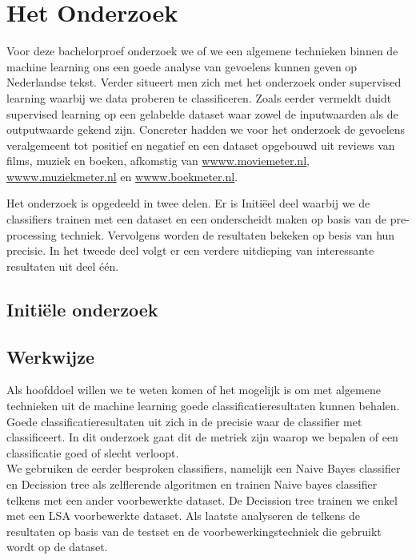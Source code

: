 \chapter{Het Onderzoek}\label{Het Onderzoek}

Voor deze bachelorproef onderzoek we of we een algemene technieken binnen de machine learning ons een goede analyse van gevoelens kunnen geven op Nederlandse tekst. Verder situeert men zich met het onderzoek  onder supervised learning waarbij we data proberen te classificeren. Zoals eerder vermeldt duidt supervised learning op een gelabelde dataset waar zowel de inputwaarden als de outputwaarde gekend zijn. Concreter hadden we voor het onderzoek de gevoelens veralgemeent tot positief en negatief en een dataset opgebouwd uit reviews van films, muziek en boeken, afkomstig van \url{wwww.moviemeter.nl}, \url{wwww.muziekmeter.nl}
en \url{wwww.boekmeter.nl}.

Het onderzoek is opgedeeld in twee delen. Er is Initi\"eel deel waarbij we de classifiers trainen met een dataset en een onderscheidt maken op basis van de pre-processing techniek. Vervolgens worden de resultaten bekeken op besis van hun precisie. In het tweede deel volgt er een verdere uitdieping van interessante resultaten uit deel \'e\'en.

\section{Initi\"ele onderzoek}\label{Deel 1}

\section{Werkwijze}\label{Werkwijze}

Als hoofddoel willen we te weten komen of het mogelijk is om met algemene technieken uit de machine learning goede classificatieresultaten kunnen behalen. Goede classificatieresultaten uit zich in de precisie waar de classifier met classificeert. In dit onderzoek gaat dit de metriek zijn waarop we bepalen of een classificatie goed of slecht verloopt.\\
We gebruiken de eerder besproken classifiers, namelijk een Naive Bayes classifier en Decission tree als zelflerende algoritmen en trainen Naive bayes classifier telkens met een ander voorbewerkte dataset. De Decission tree trainen we enkel met een LSA voorbewerkte dataset. Als laatste analyseren de telkens de resultaten op basis van de testset en de voorbewerkingstechniek die gebruikt wordt op de dataset.

